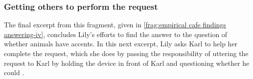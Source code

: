 


\subsubsection{Getting others to perform the request}\label{sec:empirical cafe findings answering others}
\begin{revisedsubmission}
The final excerpt from this fragment, given in \autoref{frag:empirical cafe findings answering-iv}, concludes Lily's efforts to find the answer to the question of whether animals have accents.
In this next excerpt, Lily asks Karl to help her complete the request, which she does by passing the responsibility of uttering the request to Karl by holding the device in front of Karl and questioning whether he could .


\end{revisedsubmission}
